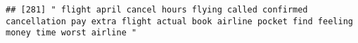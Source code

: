 \documentclass[
]{article}
\begin{document}
\begin{verbatim}
## [281] " flight april cancel hours flying called confirmed cancellation pay extra flight actual book airline pocket find feeling money time worst airline "                                                                                                                                                                                                                                                                                                                                                                                                                                                                                                                                                                                                                                                                                                                                                                                                                                                                                                                                                                                                                                                                                                                                                                                                                                                                                                                                                                                                                                                                                                                                                                                                                                            

\end{verbatim}
\end{document}
